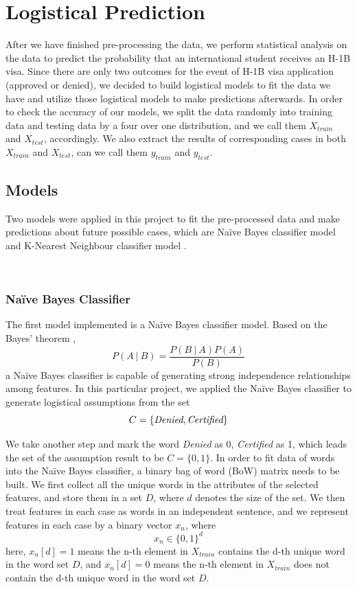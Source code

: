 \documentclass[conference]{IEEEtran}
\newcommand\givenbase[1][]{\:#1\lvert\:}
\let\given\givenbase
\begin{document}
\section{Logistical Prediction}

After we have finished pre-processing the data, we perform statistical analysis on the data to predict the probability that an international student receives an H-1B visa. Since there are only two outcomes for the event of H-1B visa application (approved or denied), we decided to build logistical models to fit the data we have and utilize those logistical models to make predictions afterwards. In order to check the accuracy of our models, we split the data randomly into training data and testing data by a four over one distribution, and we call them \(X_{train}\) and \(X_{test}\), accordingly. We also extract the results of corresponding cases in both \(X_{train}\) and \(X_{test}\), can we call them \(y_{train}\) and \(y_{test}\).
\subsection{Models}

Two models were applied in this project to fit the pre-processed data and make predictions about future possible cases, which are Naïve Bayes classifier model \cite{b8} and K-Nearest Neighbour classifier model \cite{b9}. 

\hfill\\

\subsubsection{Naïve Bayes Classifier}

The first model implemented is a Naïve Bayes classifier model. Based on the Bayes' theorem \cite{b10}, 
\[P(A \given B) = \frac{P(B \given A) P(A)}{P(B)} \]
a Naïve Bayes classifier is capable of generating strong independence relationships among features. In this particular project, we applied the Naïve Bayes classifier to generate logistical assumptions from the set \[C = \{\emph{Denied}, \emph{Certified} \}\]

We take another step and mark the word \emph{Denied} as 0, \emph{Certified} as 1, which leads the set of the assumption result to be \(C = \{0, 1 \}\). 
In order to fit data of words into the Naïve Bayes classifier, a binary bag of word (BoW) \cite{b11}  matrix needs to be built. We first collect all the unique words in the attributes of the selected features, and store them in a set \(D\), where \(d\) denotes the size of the set. We then treat features in each case as words in an independent sentence, and we represent features in each case by a binary vector \(x_n\), where \[x_n \in \{0, 1\}^d\]
here, \(x_n[d] = 1 \) means the n-th element in \(X_{train}\) contains the d-th unique word in the word set \(D\), and \(x_n[d] = 0 \) means the n-th element in \(X_{train}\) does not contain the d-th unique word in the word set \(D\). 
\end{document}
